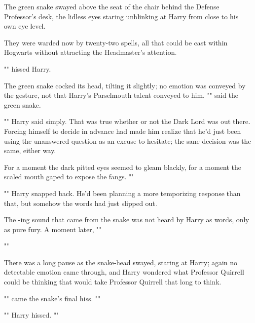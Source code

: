 The green snake swayed above the seat of the chair behind the Defense 
Professor's desk, the lidless eyes staring unblinking at Harry from close to 
his own eye level.

They were warded now by twenty-two spells, all that could be cast within 
Hogwarts without attracting the Headmaster's attention.

"" hissed Harry.

The green snake cocked its head, tilting it slightly; no emotion was conveyed 
by the gesture, not that Harry's Parselmouth talent conveyed to him. 
"" said the green snake.

"" Harry said simply. That was true whether or not the Dark 
Lord was out there. Forcing himself to decide in advance had made him realize 
that he'd just been using the unanswered question as an excuse to hesitate; the 
sane decision was the same, either way.

For a moment the dark pitted eyes seemed to gleam blackly, for a moment the 
scaled mouth gaped to expose the fangs. ""

"" Harry snapped back. 
He'd been planning a more temporizing response than that, but somehow the words 
had just slipped out.

The -ing sound that came from the snake was not heard by Harry as 
words, only as pure fury. A moment later, ""

""

There was a long pause as the snake-head swayed, staring at Harry; again no 
detectable emotion came through, and Harry wondered what Professor Quirrell 
could be thinking that would take Professor Quirrell that long to think.

"" came the snake's final 
hiss. ""

"" Harry hissed. ""

